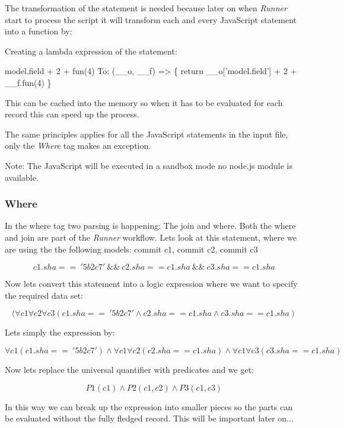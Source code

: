The transformation of the statement is needed because later on when \textit{Runner} start to process the script
it will transform each and every JavaScript statement into a function by:

Creating a lambda expression of the statement: 

 model.field + 2 + fun(4)\newline 
 To:\newline
 (\_\_o, \_\_f) => \{ return \_\_o['model.field'] + 2 + \_\_f.fun(4) \}\newline

This can be cached into the memory so when it has to be evaluated for each record this can speed up the process.

The same principles applies for all the JavaScript statements in the input file, only the \textit{Where} tag makes an exception. 

Note: The JavaScript will be executed in a sandbox mode no node.js module is
available. 

\newpage
\subsubsection{Where}

In the where tag two parsing is happening: The join and where. Both the where and join are part of the \textit{Runner} workflow. Lets look at this statement, where we are using the the following models: commit c1, commit c2, commit c3

\[ c1.sha ==\ '5b2c7'\ \&\&\ c2.sha == c1.sha\ \&\&\ c3.sha == c1.sha\]

Now lets convert this statement into a logic expression where we want to specify the required
data set:

\[( \forall{c1}\forall{c2}\forall{c3}(c1.sha ==\ '5b2c7' \wedge c2.sha == c1.sha \wedge c3.sha == c1.sha)\]

Lets simply the expression by:

\[ \forall{c1}(c1.sha ==\ '5b2c7') \wedge \forall{c1}\forall{c2}(c2.sha == c1.sha) \wedge \forall{c1}\forall{c3}(c3.sha == c1.sha)\]

Now lets replace the universal quantifier with predicates and we get:

\[ P1(c1) \wedge P2(c1,c2) \wedge P3(c1,c3)\]

In this way we can break up the expression into smaller pieces so the parts can be evaluated without the fully fledged record. This will be important later on...

